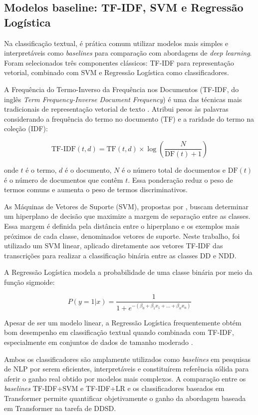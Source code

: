 \documentclass[
    12pt,                %
    openright,           %
    oneside,             %
    a4paper,             %
    english,             %
    brazil               %
]{abntex2}
\begin{document}

\subsection{Modelos baseline: TF-IDF, SVM e Regressão Logística}

Na classificação textual, é prática comum utilizar modelos mais simples e interpretáveis como \textit{baselines} para comparação com abordagens de \textit{deep learning}. Foram selecionados três componentes clássicos: TF-IDF para representação vetorial, combinado com SVM e Regressão Logística como classificadores.

A Frequência do Termo-Inverso da Frequência nos Documentos (TF-IDF, do inglês \textit{Term Frequency-Inverse Document Frequency}) é uma das técnicas mais tradicionais de representação vetorial de texto \cite{Manning2008}. Atribui pesos às palavras considerando a frequência do termo no documento (TF) e a raridade do termo na coleção (IDF):

\[
\text{TF-IDF}(t,d) = \text{TF}(t,d) \times \log\left(\frac{N}{\text{DF}(t) + 1}\right)
\]

onde \( t \) é o termo, \( d \) é o documento, \( N \) é o número total de documentos e \( \text{DF}(t) \) é o número de documentos que contêm \( t \). Essa ponderação reduz o peso de termos comuns e aumenta o peso de termos discriminativos.

As Máquinas de Vetores de Suporte (SVM), propostas por , buscam determinar um hiperplano de decisão que maximize a margem de separação entre as classes. Essa margem é definida pela distância entre o hiperplano e os exemplos mais próximos de cada classe, denominados vetores de suporte. Neste trabalho, foi utilizado um SVM linear, aplicado diretamente aos vetores TF-IDF das transcrições para realizar a classificação binária entre as classes DD e NDD.

A Regressão Logística modela a probabilidade de uma classe binária por meio da função sigmoide:

\[
P(y=1|x) = \frac{1}{1 + e^{-(\beta_0 + \beta_1 x_1 + \dots + \beta_n x_n)}}
\]

Apesar de ser um modelo linear, a Regressão Logística frequentemente obtém bom desempenho em classificação textual quando combinada com TF-IDF, especialmente em conjuntos de dados de tamanho moderado \cite{Manning2008}.

Ambos os classificadores são amplamente utilizados como \textit{baselines} em pesquisas de NLP por serem eficientes, interpretáveis e constituírem referência sólida para aferir o ganho real obtido por modelos mais complexos. A comparação entre os \textit{baselines} TF-IDF+SVM e TF-IDF+LR e os classificadores baseados em Transformer permite quantificar objetivamente o ganho da abordagem baseada em Transformer na tarefa de DDSD.
\end{document}
